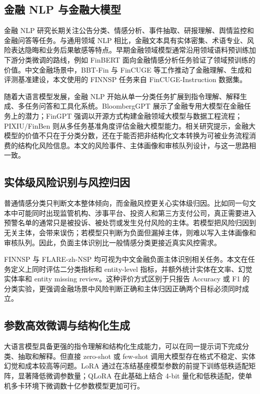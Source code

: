 \documentclass[UTF8,a4paper,12pt]{ctexart}
\begin{document}
\subsection{金融 NLP 与金融大模型}

金融 NLP 研究长期关注公告分类、情感分析、事件抽取、研报理解、舆情监控和金融问答等任务。与通用领域 NLP 相比，金融文本具有实体密集、术语专业、风险表达隐晦和业务后果敏感等特点。早期金融领域模型通常沿用领域语料预训练加下游分类微调的路线，例如 FinBERT 面向金融情感分析任务验证了领域预训练的价值\cite{finbert}。中文金融场景中，BBT-Fin 与 FinCUGE 等工作推动了金融理解、生成和评测基准建设\cite{bbtfin}，本文使用的 FINNSP 任务来自 FinCUGE-Instruction 数据集\cite{fincuge}。

随着大语言模型发展，金融 NLP 开始从单一分类任务扩展到指令理解、解释生成、多任务问答和工具化系统。BloombergGPT 展示了金融专用大模型在金融任务上的潜力\cite{bloomberggpt}；FinGPT 强调以开源方式构建金融领域大模型与数据工程流程\cite{fingpt}；PIXIU/FinBen 则从多任务基准角度评估金融大模型能力\cite{pixiu}。相关研究提示，金融大模型的价值不只在于分类分数，还在于能否把非结构化文本转换为可被业务流程消费的结构化风险信息。本文的风险事件、主体画像和审核队列设计，与这一思路相一致。

\subsection{实体级风险识别与风控归因}

普通情感分类只判断文本整体倾向，而金融风控更关心实体级归因。比如同一句文本中可能同时出现监管机构、涉事平台、投资人和第三方支付公司，真正需要进入预警名单的通常只是被投诉、被处罚或发生兑付风险的主体。若模型把风险归因到无关主体，会带来误伤；若模型只判断为负面但漏掉主体，则难以写入主体画像和审核队列。因此，负面主体识别比一般情感分类更接近真实风控需求。

FINNSP 与 FLARE-zh-NSP 均可视为中文金融负面主体识别相关任务\cite{fincuge,flare}。本文在任务定义上同时评估二分类指标和 entity-level 指标，并额外统计实体在文率、幻觉实体率和 entity missing review。这种评价方式区别于只报告 Accuracy 或 F1 的分类实验，更强调金融场景中风险判断正确和主体归因正确两个目标必须同时成立。

\subsection{参数高效微调与结构化生成}

大语言模型具备更强的指令理解和结构化生成能力，可以在同一提示词下完成分类、抽取和解释。但直接 zero-shot 或 few-shot 调用大模型存在格式不稳定、实体幻觉和成本较高等问题。LoRA 通过在冻结基座模型参数的前提下训练低秩适配矩阵，显著降低微调参数量\cite{lora}；QLoRA 在此基础上结合 4-bit 量化和低秩适配，使单机多卡环境下微调数十亿参数模型更加可行\cite{qlora}。
\end{document}
